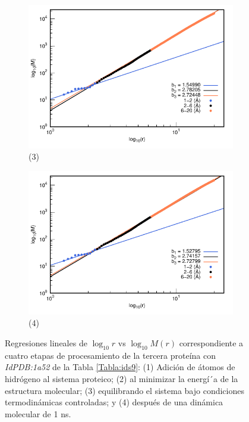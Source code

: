 \begin{figure}[H]
	\vspace{0cm} %
	
	\hspace{-0.3cm} 
	\begin{subfigure}{0.49\textwidth}
		\centering
		\includegraphics[width=\linewidth,page=1]{graphs/PDBs/1a52/1a52Eq.pdf}
		\caption{(3)}
	\end{subfigure}
	\hspace{0.2cm}
	\begin{subfigure}{0.49\textwidth} %
		\centering
		\includegraphics[width=\linewidth,page=1]{graphs/PDBs/1a52/1a521ns.pdf}
		\caption{(4)}
	\end{subfigure}
	\caption{Regresiones lineales de $\log_{10}r$ vs $\log_{10}M(r)$ correspondiente a cuatro etapas de procesamiento de la tercera prote\'{i}na con \textit{IdPDB:1a52} de la Tabla \ref{Tabla:ids9}: (1) Adici\'{o}n de \'{a}tomos de hidr\'{o}geno al sistema proteico; (2) al minimizar la energ\'{i´}a de la estructura molecular; (3) equilibrando el sistema bajo condiciones termodin\'{a}micas controladas; y (4) despu\'{e}s de una din\'{a}mica molecular de 1 ns.}
	\label{fig:1a52}
\end{figure}


